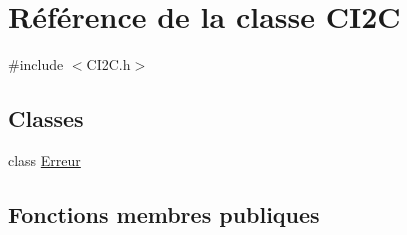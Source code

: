 \hypertarget{class_c_i2_c}{\section{Référence de la classe C\+I2\+C}
\label{class_c_i2_c}
}


{\ttfamily \#include $<$C\+I2\+C.\+h$>$}

\subsection*{Classes}
\begin{DoxyCompactItemize}
\item 
class \hyperlink{class_c_i2_c_1_1_erreur}{Erreur}
\end{DoxyCompactItemize}
\subsection*{Fonctions membres publiques}
